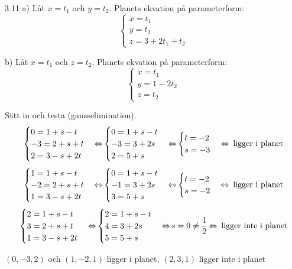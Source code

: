 \begin{task}{3.11 a)}
	Låt $x=t_1$ och $y=t_2$. Planets ekvation på parameterform:
	\[\begin{cases}
		x=t_1 \\
		y=t_2 \\
		z=3+2t_1+t_2
	\end{cases}\]
\end{task}

\begin{task}{b)}
	Låt $x=t_1$ och $z=t_2$. Planets ekvation på parameterform:
	\[\begin{cases}
		x=t_1 \\
		y=1-2t_2 \\
		z=t_2
	\end{cases}\]
\end{task}

\begin{task}{3.12}
	Sätt in och testa (gausselimination).
	\[\begin{cases}
		0=1+s-t \\
		-3=2+s+t \\
		2=3-s+2t
	\end{cases} \operatorname{\Leftrightarrow}
	\begin{cases}
		0=1+s-t \\
		-3=3+2s \\
		2=5+s
	\end{cases} \operatorname{\Leftrightarrow}
	\begin{cases}
		t=-2 \\
		s=-3
	\end{cases} \operatorname{\Leftrightarrow}
	\text{ ligger i planet}\]
	\[\begin{cases}
		1=1+s-t \\
		-2=2+s+t \\
		1=3-s+2t
	\end{cases} \operatorname{\Leftrightarrow}
	\begin{cases}
		0=1+s-t \\
		-1=3+2s \\
		3=5+s
	\end{cases} \operatorname{\Leftrightarrow}
	\begin{cases}
		t=-2 \\
		s=-2
	\end{cases} \operatorname{\Leftrightarrow}
	\text{ ligger i planet}\]
	\[\begin{cases}
		2=1+s-t \\
		3=2+s+t \\
		1=3-s+2t
	\end{cases} \operatorname{\Leftrightarrow}
	\begin{cases}
		2=1+s-t \\
		4=3+2s \\
		5=5+s
	\end{cases} \operatorname{\Leftrightarrow}
	s=0 \neq \frac{1}{2} \operatorname{\Leftrightarrow}
	\text{ ligger inte i planet}\]

	\ans $(0,-3,2)$ och $(1,-2,1)$ ligger i planet, $(2,3,1)$ ligger inte i planet
\end{task}

